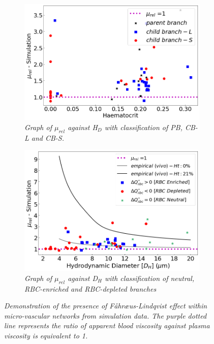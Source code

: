 \begin{figure}[H]
\centering
\begin{subfigure}{0.50 \textwidth}
    \includegraphics[width=1\textwidth]{images/Fahraeus-LindqvistEffectH.png}
    \caption{\textit{Graph of $\mu_{rel}$ against H$_{D}$ with classification of PB, CB-L and CB-S.} \label{Fahraeus-LindqvistEffectH}}
\end{subfigure}
\hfill
\begin{subfigure}{0.48 \textwidth}
    \includegraphics[width=1\textwidth]{images/Fahraeus-LindqvistEffectD.png}
    \caption{\textit{Graph of $\mu_{rel}$ against D$_{H}$ with classification of neutral, RBC-enriched and RBC-depleted branches} \label{Fahraeus-LindqvistEffectD}}
\end{subfigure}
\caption{\textit{Demonstration of the presence of F{\aa}hr{\ae}us-Lindqvist effect within micro-vascular networks from simulation data. The purple dotted line represents the ratio of apparent blood viscosity against plasma viscosity is equivalent to 1.} \label{Fahraeus-LindqvistEffects}}
\end{figure}

